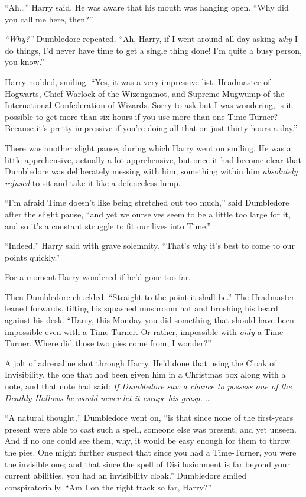 ``Ah\ldots{}'' Harry said. He was aware that his mouth was hanging open.
``Why did you call me here, then?''

\emph{``Why?''} Dumbledore repeated. ``Ah, Harry, if I went around all
day asking \emph{why} I do things, I'd never have time to get a single
thing done! I'm quite a busy person, you know.''

Harry nodded, smiling. ``Yes, it was a very impressive list. Headmaster
of Hogwarts, Chief Warlock of the Wizengamot, and Supreme Mugwump of the
International Confederation of Wizards. Sorry to ask but I was
wondering, is it possible to get more than six hours if you use more
than one Time-Turner? Because it's pretty impressive if you're doing all
that on just thirty hours a day.''

There was another slight pause, during which Harry went on smiling. He
was a little apprehensive, actually a lot apprehensive, but once it had
become clear that Dumbledore was deliberately messing with him,
something within him \emph{absolutely refused} to sit and take it like a
defenceless lump.

``I'm afraid Time doesn't like being stretched out too much,'' said
Dumbledore after the slight pause, ``and yet we ourselves seem to be a
little too large for it, and so it's a constant struggle to fit our
lives into Time.''

``Indeed,'' Harry said with grave solemnity. ``That's why it's best to
come to our points quickly.''

For a moment Harry wondered if he'd gone too far.

Then Dumbledore chuckled. ``Straight to the point it shall be.'' The
Headmaster leaned forwards, tilting his squashed mushroom hat and
brushing his beard against his desk. ``Harry, this Monday you did
something that should have been impossible even with a Time-Turner. Or
rather, impossible with \emph{only} a Time-Turner. Where did those two
pies come from, I wonder?''

A jolt of adrenaline shot through Harry. He'd done that using the Cloak
of Invisibility, the one that had been given him in a Christmas box
along with a note, and that note had said: \emph{If Dumbledore saw a
chance to possess one of the Deathly Hallows he would never let it
escape his grasp.} \emph{\ldots{}}

``A natural thought,'' Dumbledore went on, ``is that since none of the
first-years present were able to cast such a spell, someone else was
present, and yet unseen. And if no one could see them, why, it would be
easy enough for them to throw the pies. One might further suspect that
since you had a Time-Turner, you were the invisible one; and that since
the spell of Disillusionment is far beyond your current abilities, you
had an invisibility cloak.'' Dumbledore smiled conspiratorially. ``Am I
on the right track so far, Harry?''

